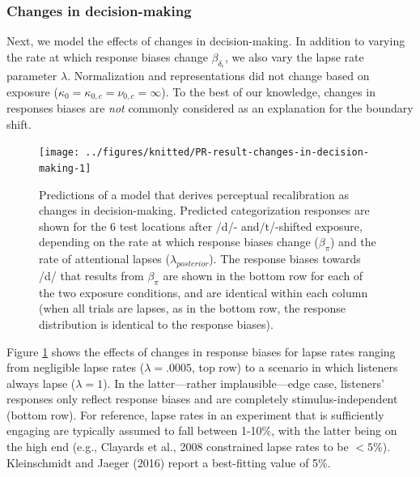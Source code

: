 \documentclass[
  11pt,
  english,
  man,floatsintext]{apa6}
\begin{document}
\hypertarget{changes-in-decision-making}{%
\subsubsection{Changes in decision-making}\label{changes-in-decision-making}}

Next, we model the effects of changes in decision-making. In addition to varying the rate at which response biases change \(\beta_{\delta_\epsilon}\), we also vary the lapse rate parameter \(\lambda\). Normalization and representations did not change based on exposure (\(\kappa_0 = \kappa_{0,c} = \nu_{0,c} = \infty\)). To the best of our knowledge, changes in responses biases are \emph{not} commonly considered as an explanation for the boundary shift.



\begin{figure}

{\centering \texttt{[image: ../figures/knitted/PR-result-changes-in-decision-making-1]} 

}

\caption{Predictions of a model that derives perceptual recalibration as changes in decision-making. Predicted categorization responses are shown for the 6 test locations after /d/- and/t/-shifted exposure, depending on the rate at which response biases change (\(\beta_{\pi}\)) and the rate of attentional lapses (\(\lambda_{posterior}\)). The response biases towards /d/ that results from \(\beta_{\pi}\) are shown in the bottom row for each of the two exposure conditions, and are identical within each column (when all trials are lapses, as in the bottom row, the response distribution is identical to the response biases).}\label{fig:PR-result-changes-in-decision-making}
\end{figure}

Figure \ref{fig:PR-result-changes-in-decision-making} shows the effects of changes in response biases for lapse rates ranging from negligible lapse rates (\(\lambda = .0005\), top row) to a scenario in which listeners always lapse (\(\lambda = 1\)). In the latter---rather implausible---edge case, listeners' responses only reflect response biases and are completely stimulus-independent (bottom row). For reference, lapse rates in an experiment that is sufficiently engaging are typically assumed to fall between 1-10\%, with the latter being on the high end (e.g., Clayards et al., 2008 constrained lapse rates to be \(<5\)\%). Kleinschmidt and Jaeger (2016) report a best-fitting value of 5\%.
\end{document}
